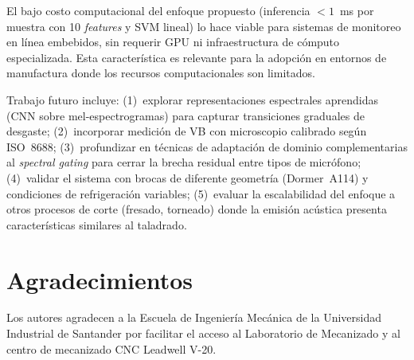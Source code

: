 \documentclass[10pt,twocolumn]{article}
\begin{document}
El bajo costo computacional del enfoque propuesto (inferencia $< 1$~ms
por muestra con 10 \textit{features} y SVM lineal) lo hace viable para
sistemas de monitoreo en línea embebidos, sin requerir GPU ni
infraestructura de cómputo especializada. Esta característica es relevante
para la adopción en entornos de manufactura donde los recursos
computacionales son limitados.

Trabajo futuro incluye: (1)~explorar representaciones espectrales
aprendidas (CNN sobre mel-espectrogramas) para capturar transiciones
graduales de desgaste; (2)~incorporar medición de VB con microscopio
calibrado según ISO~8688; (3)~profundizar en técnicas de adaptación de
dominio complementarias al \textit{spectral gating} para cerrar la brecha
residual entre tipos de micrófono; (4)~validar el sistema con brocas de
diferente geometría (Dormer~A114) y condiciones de refrigeración
variables; (5)~evaluar la escalabilidad del enfoque a otros procesos de
corte (fresado, torneado) donde la emisión acústica presenta
características similares al taladrado.

\section*{Agradecimientos}

Los autores agradecen a la Escuela de Ingeniería Mecánica de la
Universidad Industrial de Santander por facilitar el acceso al Laboratorio
de Mecanizado y al centro de mecanizado CNC Leadwell V-20.
\end{document}
